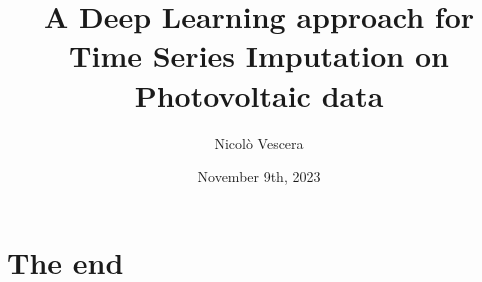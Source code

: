 \documentclass[xcolor={table,x11names,usenames}]{beamer}
\title{A Deep Learning approach for Time Series Imputation on Photovoltaic data}
\date{November 9th, 2023}
\author{Nicolò Vescera}
\institute{Università degli Studi di Perugia}
\begin{document}
  \maketitle
  
  
    
    
    
    
    
    

    \section{The end}
    
\end{document}
